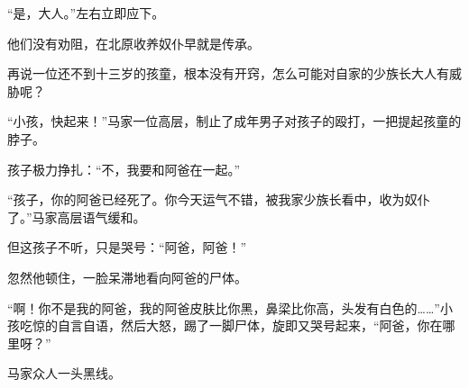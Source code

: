 \begin{this_body}
“是，大人。”左右立即应下。

他们没有劝阻，在北原收养奴仆早就是传承。

再说一位还不到十三岁的孩童，根本没有开窍，怎么可能对自家的少族长大人有威胁呢？

“小孩，快起来！”马家一位高层，制止了成年男子对孩子的殴打，一把提起孩童的脖子。

孩子极力挣扎：“不，我要和阿爸在一起。”

“孩子，你的阿爸已经死了。你今天运气不错，被我家少族长看中，收为奴仆了。”马家高层语气缓和。

但这孩子不听，只是哭号：“阿爸，阿爸！”

忽然他顿住，一脸呆滞地看向阿爸的尸体。

“啊！你不是我的阿爸，我的阿爸皮肤比你黑，鼻梁比你高，头发有白色的……”小孩吃惊的自言自语，然后大怒，踢了一脚尸体，旋即又哭号起来，“阿爸，你在哪里呀？”

马家众人一头黑线。

\end{this_body}

